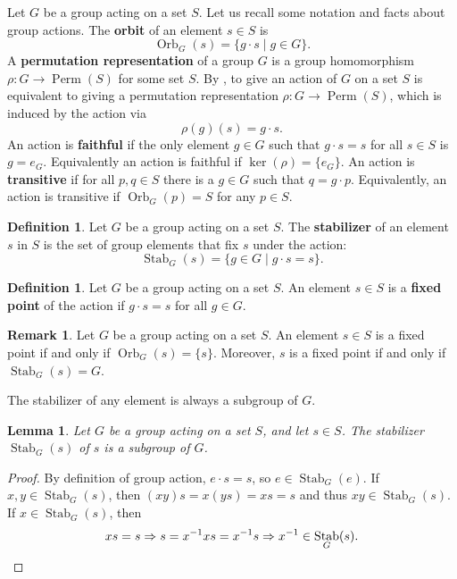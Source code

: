 \documentclass[12pt]{report}
\newtheorem{lemma}[theorem]{Lemma}
\numberwithin{equation}{section}
\numberwithin{theorem}{chapter}
\theoremstyle{definition}
\newtheorem{definition}[theorem]{Definition}
\newtheorem*{basic properties}{Basic Properties}
\newtheorem*{Important Remark}{Important Remark}
\newtheorem{remark}[theorem]{Remark}
\newcommand{\df}[1]{{\bf #1}\index{#1}}
\DeclareMathOperator{\Perm}{Perm}
\renewcommand{\ker}{\operatorname{ker}}
\DeclareMathOperator{\Orb}{Orb}
\DeclareMathOperator{\Stab}{Stab}
\begin{document}
Let $G$ be a group acting on a set $S$. Let us recall some notation and facts about group actions. The {\bf orbit} of an element $s \in S$ is
$$\Orb_G(s)=\{g\cdot s \mid g\in G\}.$$
A {\bf permutation representation} of a group $G$ is a group homomorphism $\rho\!: G \to \Perm(S)$ for some set $S$. By , to give an action of $G$ on a set $S$ is equivalent to giving a permutation representation $\rho\!: G \to \Perm(S)$, which is induced by the action via
$$\rho(g)(s) = g \cdot s.$$
An action is {\bf faithful} if the only element $g\in G$ such that $g\cdot s=s$ for all $s\in S$ is $g=e_G$. Equivalently an action is  faithful if $\ker(\rho) = \{e_G\}$. 
 An action is {\bf transitive} if for all $p,q \in S$ there is a $g \in G$ such that $q=g\cdot p$. Equivalently, an action is transitive if $\Orb_G(p)=S$ for any $p\in S$.



\begin{definition}
Let $G$ be a group acting on a set $S$. 	
The \df{stabilizer} of an element $s$ in $S$ is the set of group elements that fix $s$ under the action:
$$\Stab_G(s)=\{g\in G \mid g\cdot s=s\}.$$
\end{definition}


\begin{definition}
Let $G$ be a group acting on a set $S$. An element $s \in S$ is a \df{fixed point} of the action if $g \cdot s = s$ for all $g \in G$.
\end{definition}


\begin{remark}
	Let $G$ be a group acting on a set $S$. An element $s \in S$ is a fixed point if and only if $\Orb_G(s) = \{ s \}$. Moreover, $s$ is a fixed point if and only if $\Stab_G(s) = G$.
\end{remark}


The stabilizer of any element is always a subgroup of $G$.


\begin{lemma}\label{stabilizer is a subgroup}
Let $G$ be a group acting on a set $S$, and let $s \in S$. The stabilizer $\Stab_G(s)$ of $s$ is a subgroup of $G$.
\end{lemma}

\begin{proof}
By definition of group action, $e \cdot s = s$, so $e \in \Stab_G(e)$.
If $x,y \in \Stab_G(s)$, then $(xy)s = x(ys) = xs = s$ and thus $xy \in \Stab_G(s)$. If $x \in \Stab_G(s)$, then 
$$xs = s \Rightarrow s = x^{-1}xs = x^{-1}s \Rightarrow x^{-1} \in \Stab_G(s).\qedhere$$
\end{proof}
\end{document}

